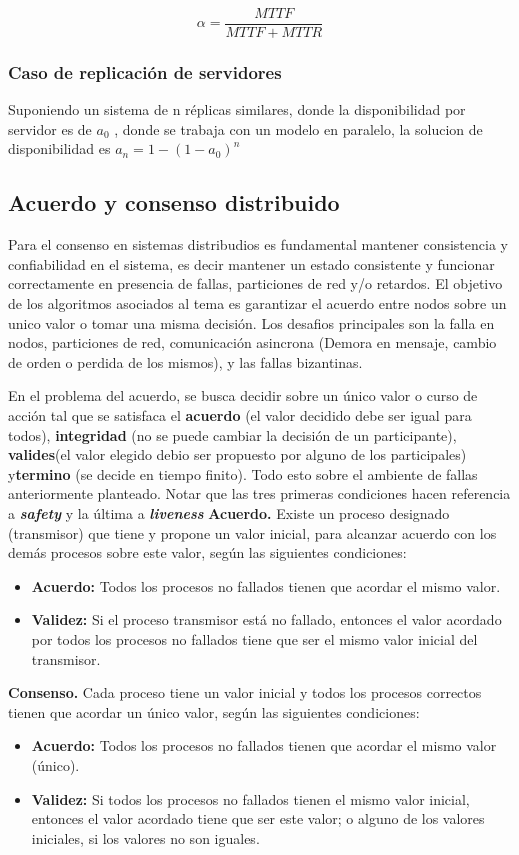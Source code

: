 \[
    \alpha = \frac{MTTF}{MTTF+MTTR}
\]

\subsubsection{Caso de replicación de servidores}
Suponiendo un sistema de n réplicas similares, donde la disponibilidad por servidor es de $a_0$ , donde se trabaja con un modelo en paralelo, la solucion de disponibilidad es $a_n=1-(1-a_0)^n$

\subsection{Acuerdo y consenso distribuido}
Para el consenso  en sistemas distribudios es fundamental mantener consistencia y confiabilidad en el sistema, es decir mantener un estado consistente y funcionar correctamente en presencia de fallas, particiones de red y/o retardos. El objetivo de los algoritmos asociados al tema es garantizar el acuerdo entre nodos sobre un unico valor o tomar una misma decisión. Los desafios principales son la falla en nodos, particiones de red, comunicación asincrona (Demora en mensaje, cambio de orden o perdida de los mismos), y las fallas bizantinas.

En el problema del acuerdo, se busca decidir sobre un único valor o curso de acción tal que se satisfaca el \textbf{acuerdo} (el valor decidido debe ser igual para todos), \textbf{integridad} (no se puede cambiar la decisión de un participante), \textbf{valides}(el valor elegido debio ser propuesto por alguno de los participales) y\textbf{termino} (se decide en tiempo finito). Todo esto sobre el ambiente de fallas anteriormente planteado. Notar que las tres primeras condiciones hacen referencia a \textbf{\textit{safety}} y la última a \textbf{\textit{liveness}}
\textbf{Acuerdo.} Existe un proceso designado (transmisor) que tiene y propone un valor inicial, para alcanzar acuerdo con los demás procesos sobre este valor, según las siguientes condiciones:
\begin{itemize}
    \item \textbf{Acuerdo:} Todos los procesos no fallados tienen que acordar el mismo valor.
    \item \textbf{Validez:} Si el proceso transmisor está no fallado, entonces el valor acordado por todos los procesos no fallados tiene que ser el mismo valor inicial del transmisor.
\end{itemize}

\textbf{Consenso.} Cada proceso tiene un valor inicial y todos los procesos correctos tienen que acordar un único valor, según las siguientes condiciones:
\begin{itemize}
    \item \textbf{Acuerdo:} Todos los procesos no fallados tienen que acordar el mismo valor (único).
    \item \textbf{Validez:} Si todos los procesos no fallados tienen el mismo valor inicial, entonces el valor acordado tiene que ser este valor; o alguno de los valores iniciales, si los valores no son iguales.
\end{itemize}


